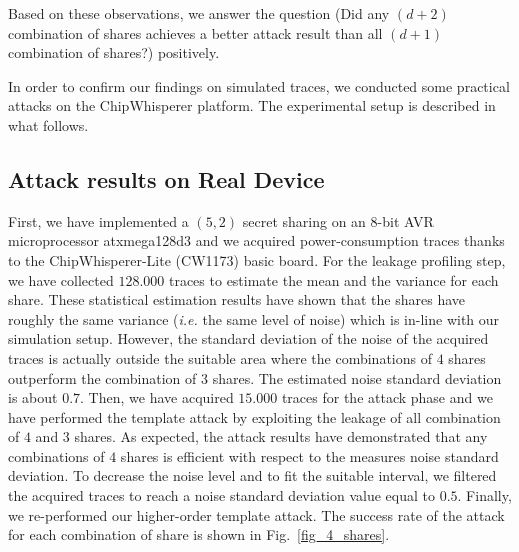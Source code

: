 \documentclass{llncs}
\begin{document}
Based on these observations, we answer the question (Did any $(d+2)$ combination of shares achieves a better attack result than all $(d+1)$ combination of shares?) positively. 

In order to confirm our findings on simulated traces, we conducted some practical attacks on the ChipWhisperer platform. The experimental setup is described in what follows. 

\subsection{Attack results on Real Device}

First, we have implemented a $(5,2)$ secret sharing on an $8$-bit AVR microprocessor atxmega128d3 and we acquired power-consumption traces thanks to the ChipWhisperer-Lite (CW1173) basic board. For the leakage profiling step, we have collected $128.000$ traces to estimate the mean and the variance for each share. These statistical estimation results have shown that the shares have roughly the same variance (\emph{i.e.} the same level of noise) which is in-line with our simulation setup. However, the standard deviation of the noise of the acquired traces is actually outside the suitable area where the combinations of $4$ shares outperform the combination of $3$ shares. The estimated noise standard deviation is about $0.7$.
Then, we have acquired $15.000$ traces for the attack phase and we have performed the template attack by exploiting the leakage of all combination of $4$ and $3$ shares. As expected, the attack results have demonstrated that any combinations of $4$ shares is efficient with respect to the measures noise standard deviation. To decrease the noise level and to fit the suitable interval, we filtered the acquired traces to reach a noise standard deviation value equal to $0.5$. Finally, we re-performed our higher-order template attack. The success rate of the attack for each combination of share is shown in Fig.~\ref{fig_4_shares}.    
\end{document}
